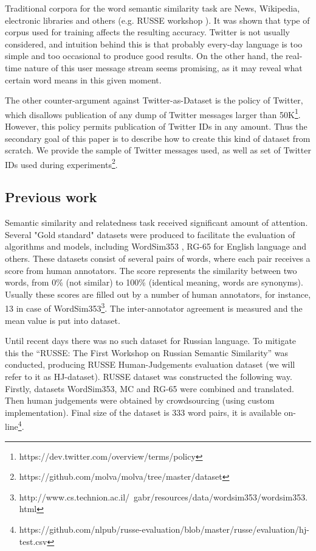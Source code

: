 \documentclass{llncs}
\begin{document}
Traditional corpora for the word semantic similarity task are News, Wikipedia, electronic libraries and others (e.g. RUSSE workshop \cite{Panchenko2015}). It was shown that type of corpus used for training affects the resulting accuracy. Twitter is not usually considered, and intuition behind this is that probably every-day language is too simple and too occasional to produce good results. On the other hand, the real-time nature of this user message stream seems promising, as it may reveal what certain word means in this given moment.  

The other counter-argument against Twitter-as-Dataset is the policy of Twitter, which disallows publication of any dump of Twitter messages larger than 50K\footnote{https://dev.twitter.com/overview/terms/policy}. However, this policy permits publication of Twitter IDs in any amount. Thus the secondary goal of this paper is to describe how to create this kind of dataset from scratch. We provide the sample of Twitter messages used, as well as set of Twitter IDs used during experiments\footnote{https://github.com/molva/molva/tree/master/dataset}.

\subsection{Previous work}
%
Semantic similarity and relatedness task received significant amount of attention. Several "Gold standard" datasets were produced to facilitate the evaluation of algorithms and models, including WordSim353 \cite{WordSim353}, RG-65 \cite{RG-65} for English language and others. These datasets consist of several pairs of words, where each pair receives a score from human annotators. The score represents the similarity between two words, from 0\% (not similar) to 100\% (identical meaning, words are synonyms). Usually these scores are filled out by a number of human annotators, for instance, 13 in case of WordSim353\footnote{http://www.cs.technion.ac.il/~gabr/resources/data/wordsim353/wordsim353.html}. The inter-annotator agreement is measured and the mean value is put into dataset. 

Until recent days there was no such dataset for Russian language. To mitigate this the “RUSSE: The First Workshop on Russian Semantic Similarity”\cite{Panchenko2015} was conducted, producing RUSSE Human-Judgements evaluation dataset (we will refer to it as HJ-dataset). RUSSE dataset was constructed the following way. Firstly, datasets WordSim353, MC \cite{MC} and RG-65 were combined and translated. Then human judgements were obtained by crowdsourcing (using custom implementation). Final size of the dataset is 333 word pairs, it is available on-line\footnote{https://github.com/nlpub/russe-evaluation/blob/master/russe/evaluation/hj-test.csv}.
\end{document}
